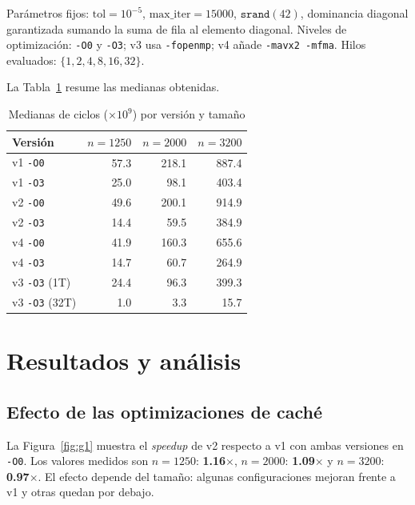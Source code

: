 \documentclass[a4paper,twocolumn]{article}
\begin{document}
Parámetros fijos: $\text{tol}{=}10^{-5}$, $\text{max\_iter}{=}15000$,
$\texttt{srand}(42)$, dominancia diagonal garantizada sumando la suma de fila
al elemento diagonal.  Niveles de optimización: \texttt{-O0} y \texttt{-O3};
v3 usa \texttt{-fopenmp}; v4 añade \mbox{\texttt{-mavx2 -mfma}}.  Hilos evaluados:
$\{1,2,4,8,16,32\}$.

La Tabla~\ref{tab:medianas} resume las medianas obtenidas.

\begin{table}[tb]
{\footnotesize
\caption{Medianas de ciclos ($\times 10^9$) por versión y tamaño}
\label{tab:medianas}
\centering
\setlength{\tabcolsep}{5pt}
\begin{tabular}{lrrr}
\toprule
\textbf{Versión} & $n{=}1250$ & $n{=}2000$ & $n{=}3200$ \\
\midrule
v1 \texttt{-O0} & 57.3 & 218.1 & 887.4 \\
v1 \texttt{-O3} & 25.0 & 98.1 & 403.4 \\
v2 \texttt{-O0} & 49.6 & 200.1 & 914.9 \\
v2 \texttt{-O3} & 14.4 & 59.5 & 384.9 \\
v4 \texttt{-O0} & 41.9 & 160.3 & 655.6 \\
v4 \texttt{-O3} & 14.7 & 60.7 & 264.9 \\
v3 \texttt{-O3} (1T) & 24.4 & 96.3 & 399.3 \\
v3 \texttt{-O3} (32T) & 1.0 & 3.3 & 15.7 \\

\bottomrule
\end{tabular}
}
\end{table}

\section{Resultados y análisis}

\subsection{Efecto de las optimizaciones de caché}

La Figura~\ref{fig:g1} muestra el \textit{speedup} de v2 respecto a v1 con ambas versiones en \texttt{-O0}. Los valores medidos son $n=1250$: \textbf{1.16$\times$}, $n=2000$: \textbf{1.09$\times$} y $n=3200$: \textbf{0.97$\times$}. El efecto depende del tamaño: algunas configuraciones mejoran frente a v1 y otras quedan por debajo.
\end{document}
